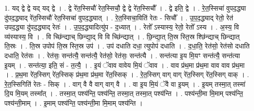 \documentclass[17pt]{extarticle}
\begin{document}
1. यद् द्वे द्वे यद् यद् द्वे । . द्वे रे॑त॒स्सिचौ॑ रेत॒स्सिचौ॒ द्वे द्वे रे॑त॒स्सिचौ᳚ । . द्वे इति॒ द्वे । . रे॒त॒स्सिचा॑ वुपद॒द्ध्या दु॑पद॒द्ध्याद् रे॑त॒स्सिचौ॑ रेत॒स्सिचा॑ वुपद॒द्ध्यात् । . रे॒त॒स्सिचा॒विति॑ रेतः - सिचौ᳚ । . उ॒प॒द॒द्ध्याद् रेतो॒ रेत॑ उपद॒द्ध्या दु॑पद॒द्ध्याद् रेतः॑ । . उ॒प॒द॒द्ध्यादित्यु॑प - द॒ध्यात् । . रेतो᳚ ऽस्यास्य॒ रेतो॒ रेतो᳚ ऽस्य । . अ॒स्य॒ वि व्य॑स्यास्य॒ वि । . वि च्छि॑न्द्याच् छिन्द्या॒द् वि वि च्छि॑न्द्यात् । . छि॒न्द्या॒त् ति॒स्र स्ति॒स्र श्छि॑न्द्याच् छिन्द्यात् ति॒स्रः । . ति॒स्र उपोप॑ ति॒स्र स्ति॒स्र उप॑ । . उप॑ दधाति दधा॒ त्युपोप॑ दधाति । . द॒धा॒ति॒ रेत॑सो॒ रेत॑सो दधाति दधाति॒ रेत॑सः । . रेत॑सः॒ सन्त॑त्यै॒ सन्त॑त्यै॒ रेत॑सो॒ रेत॑सः॒ सन्त॑त्यै । . सन्त॑त्या इ॒य मि॒यꣳ सन्त॑त्यै॒ सन्त॑त्या इ॒यम् । . सन्त॑त्या॒ इति॒ सं - त॒त्यै॒ । . इ॒यं ॅवाव वावेय मि॒यं ॅवाव । . वाव प्र॑थ॒मा प्र॑थ॒मा वाव वाव प्र॑थ॒मा । . प्र॒थ॒मा रे॑त॒स्सिग् रे॑त॒स्सिक् प्र॑थ॒मा प्र॑थ॒मा रे॑त॒स्सिक् । . रे॒त॒स्सिग् वाग् वाग् रे॑त॒स्सिग् रे॑त॒स्सिग् वाक् । . रे॒त॒स्सिगिति॑ रेतः - सिक् । . वाग् वै वै वाग् वाग् वै । . वा इ॒य मि॒यं ॅवै वा इ॒यम् । . इ॒यम् तस्मा॒त् तस्मा॑ दि॒य मि॒यम् तस्मा᳚त् । . तस्मा॒त् पश्य॑न्ति॒ पश्य॑न्ति॒ तस्मा॒त् तस्मा॒त् पश्य॑न्ति । . पश्य॑न्ती॒मा मि॒माम् पश्य॑न्ति॒ पश्य॑न्ती॒माम् । . इ॒माम् पश्य॑न्ति॒ पश्य॑न्ती॒मा मि॒माम् पश्य॑न्ति । \newline
\end{document}

